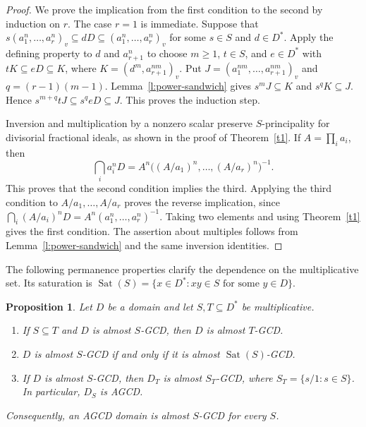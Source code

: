 \documentclass[11pt]{amsart}
\newtheorem{proposition}[theorem]{Proposition}
\theoremstyle{definition}
\theoremstyle{remark}
\DeclareMathOperator{\Sat}{Sat}
\begin{document}
\begin{proof}
We prove the implication from the first condition to the second by
induction on $r$. The case $r=1$ is immediate. Suppose that
$s(a_1^n,\ldots,a_r^n)_v\subseteq dD\subseteq(a_1^n,\ldots,a_r^n)_v$
for some $s\in S$ and $d\in D^\ast$.
Apply the defining property to $d$ and $a_{r+1}^n$ to choose $m\geq1$,
$t\in S$, and $e\in D^\ast$ with
$tK\subseteq eD\subseteq K$, where
$K=(d^m,a_{r+1}^{nm})_v$.
Put $J=(a_1^{nm},\ldots,a_{r+1}^{nm})_v$ and
$q=(r-1)(m-1)$. Lemma~\ref{l:power-sandwich} gives
$s^mJ\subseteq K$ and $s^qK\subseteq J$. Hence
$s^{m+q}tJ\subseteq s^qeD\subseteq J$.
This proves the induction step.

Inversion and multiplication by a nonzero scalar preserve
$S$-principality for divisorial fractional ideals, as shown in the
proof of Theorem~\ref{t1}. If $A=\prod_i a_i$, then
\[
\bigcap_i a_i^nD
=A^n\bigl((A/a_1)^n,\ldots,(A/a_r)^n\bigr)^{-1}.
\]
This proves that the second condition implies the third. Applying
the third condition to $A/a_1,\ldots,A/a_r$ proves the reverse
implication, since
$\bigcap_i(A/a_i)^nD=A^n(a_1^n,\ldots,a_r^n)^{-1}$.
Taking two elements and using Theorem~\ref{t1} gives the first
condition. The assertion about multiples follows from
Lemma~\ref{l:power-sandwich} and the same inversion identities.
\end{proof}

The following permanence properties clarify the dependence on the
multiplicative set. Its saturation is
$\Sat(S)=\{x\in D^\ast:xy\in S\text{ for some }y\in D\}$.

\begin{proposition}\label{p:permanence}
\label{p:enlarging-S}\label{p:localization-stability}\label{t2}
Let $D$ be a domain and let $S,T\subseteq D^\ast$ be multiplicative.
\begin{enumerate}
\item If $S\subseteq T$ and $D$ is almost $S$-GCD, then $D$ is
almost $T$-GCD.
\item $D$ is almost $S$-GCD if and only if it is almost
$\Sat(S)$-GCD.
\item If $D$ is almost $S$-GCD, then $D_T$ is almost
$S_T$-GCD, where $S_T=\{s/1:s\in S\}$.
In particular, $D_S$ is AGCD.
\end{enumerate}
Consequently, an AGCD domain is almost $S$-GCD for every $S$.
\end{proposition}
\end{document}
